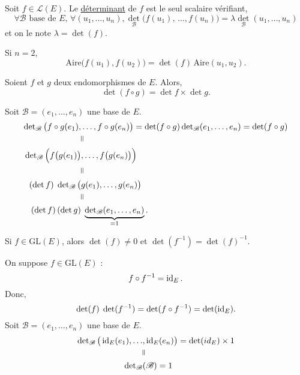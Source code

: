 \begin{defn}
	Soit $f \in \mathcal{L}(E)$. Le \underline{déterminant} de $f$ est le seul scalaire vérifiant, \[
		\forall \mathcal{B} \text{ base de } E,\, \forall (u_1, \ldots, u_n), \det_\mathcal{B}\big(f(u_1),\, \ldots, f(u_n)\big) = \lambda \det_\mathcal{B}(u_1, \ldots, u_n)
	\] et on le note $\lambda = \det(f)$.
\end{defn}

\begin{rmk}
	Si $n = 2$, \[
		\mathrm{Aire}\big(f(u_1), f(u_2)\big) = \det(f)\, \mathrm{Aire}(u_1, u_2).
	\]
\end{rmk}

\begin{prop}
	Soient $f$ et $g$ deux endomorphismes de $E$. Alors, \[
		\det(f \circ g) = \det f \times \det g.
	\]
\end{prop}

\begin{prv}
	Soit $\mathcal{B} = (e_1, \ldots, e_n)$ une base de $E$.
	\begin{align*}
		\det_\mathcal{B}\big(f \circ g(e_1),& \ldots, f \circ g(e_n)\big) = \det(f \circ g) \det_\mathcal{B}(e_1, \ldots, e_n) = \det(f \circ g)\\
			&\vrt=\\
			\det_\mathcal{B}\Big(f\big(g(e_1)\big)&, \ldots, f\big(g(e_n)\big)\Big)\\
			&\vrt=\\
			(\det f)\; \det_\mathcal{B}\big(&g(e_1), \ldots, g(e_n)\big)\\
			&\vrt=\\
			(\det f)\,(\det g)&\;\underbrace{\det_\mathcal{B}(e_1, \ldots, e_n)}_{=1}.
	\end{align*}
\end{prv}

\begin{crlr}
	Si $f \in \mathrm{GL}(E)$, alors $\det(f) \neq 0$ et $\det(f^{-1}) = \det(f)^{-1}$.
\end{crlr}

\begin{prv}
	On suppose $f \in \mathrm{GL}(E)$ : \[
		f \circ f^{-1} = \operatorname{id}_E.
	\] Donc, \[
		\operatorname{det}(f)\;\operatorname{det}(f^{-1}) = \operatorname{det}(f \circ f^{-1}) = \operatorname{det}(\operatorname{id}_E).
	\] Soit $\mathcal{B} = (e_1, \ldots, e_{n})$ une base de $E$.
	\begin{align*}
		\det_\mathcal{B}\big(\id_E(e_1), \ldots&, \id_E(e_n)\big) = \det(id_E) \times 1\\
		&\vrt=\\
		\det_\mathcal{B}&(\mathcal{B}) = 1
	\end{align*}
\end{prv}

